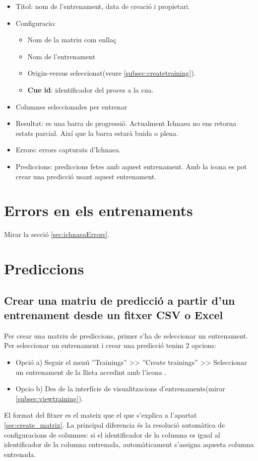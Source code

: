 \begin{itemize}
\item Títol: nom de l'entrenament, data de creació i propietari.
\item Configuracio: 
\begin{itemize}
\item Nom de la matriu com enllaç
\item Nom de l'entrenament
\item Origin-versus seleccionat(veure \ref{subsec:createtraining}).
\item \textbf{Cue id}: identificador del proces a la cua.
\end{itemize}
\item Columnes seleccionades per entrenar
\item Resultat: es una barra de progressió. Actualment Ichnaea no ens retorna estats parcial. Així que la barra estarà buida o plena.
\item Errors: errors capturats d'Ichnaea.
\item Prediccions: prediccions fetes amb aquest entrenament. Amb la icona \iconadd es pot crear una predicció usant aquest entrenament.
\end{itemize}

\section{Errors en els entrenaments}
Mirar la secció \ref{sec:ichnaeaErrors}.

\section{Prediccions}
\subsection{Crear una matriu de predicció a partir d'un entrenament desde un fitxer CSV o Excel}
Per crear una matriu de prediccions, primer s'ha de seleccionar un entrenament. Per seleccionar un entrenament i crear una predicció tenim 2 opcions:
\begin{itemize}
\item Opció a) Seguir el menú ''Trainings'' >> ''Create trainings'' >> Seleccionar un entrenament de la llista accedint amb l'icona \icontableninesquares.
\item Opcio b) Des de la interfície de visualitzacions d'entrenaments(mirar \ref{subsec:viewtraining}).
\end{itemize}
El format del fitxer es el mateix que el que s'explica a l'apartat \ref{sec:create_matrix}. La principal diferencia \'{e}s la resolució automàtica de configuracions de columnes: si el identificador de la columna es igual al identificador de la columna entrenada, automàticament s'assigna aquesta columna entrenada.

